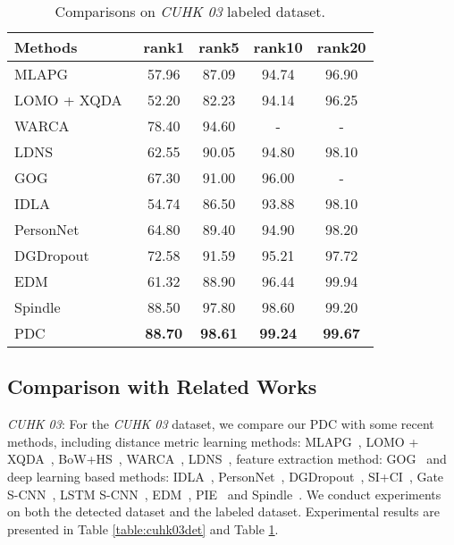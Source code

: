 \documentclass[10pt,twocolumn,letterpaper]{article}
\begin{document}
\begin{table}
\caption{Comparisons on \emph{CUHK 03} labeled dataset.}
\label{table:cuhk03lab}
\footnotesize
\begin{center}
\begin{tabular}{|l|cccc|}
\hline
 Methods            &rank1    &rank5    &rank10   &rank20 \\
\hline
MLAPG~\cite{liao2015efficient} &57.96    &87.09    &94.74    &96.90\\
LOMO + XQDA~\cite{liao2015person} &52.20    &82.23    &94.14    &96.25\\
WARCA~\cite{jose2016scalable}    &78.40    &94.60    &-    &-\\
LDNS~\cite{zhang2016learning}     &62.55    &90.05    &94.80    &98.10\\
GOG~\cite{matsukawa2016hierarchical} &67.30 &91.00 &96.00 &- \\
\hline
IDLA~\cite{ahmed5improved}  &54.74   &86.50    &93.88    &98.10\\
PersonNet~\cite{wu2016personnet}  &64.80   &89.40    &94.90   &98.20\\
DGDropout~\cite{xiao2016learning}               &72.58    &91.59    &95.21    &97.72\\
EDM~\cite{shi2016embedding}                &61.32    &88.90    &96.44    &99.94\\
\hline
Spindle~\cite{zhao2017spindle}   &88.50  &97.80   &98.60 &99.20\\
\hline
PDC      &{\bf88.70}&{\bf98.61}&{\bf99.24}&{\bf99.67}\\
\hline
\end{tabular}
\end{center}
\vspace{-7mm}
\end{table}

\subsection{Comparison with Related Works}

{ \emph{CUHK 03}:} For the \emph{CUHK 03} dataset, we compare our PDC with some recent methods, including distance metric learning methods: MLAPG~\cite{liao2015efficient}, LOMO + XQDA~\cite{liao2015person}, BoW+HS~\cite{zheng2015scalable}, WARCA~\cite{jose2016scalable}, LDNS~\cite{zhang2016learning}, feature extraction method: GOG~\cite{matsukawa2016hierarchical} and deep learning based methods: IDLA~\cite{ahmed5improved}, PersonNet~\cite{wu2016personnet}, DGDropout~\cite{xiao2016learning}, SI+CI~\cite{wangjoint}, Gate S-CNN~\cite{varior2016gated}, LSTM S-CNN~\cite{varior2016siamese}, EDM~\cite{shi2016embedding},
PIE~\cite{zheng2017pose} and Spindle~\cite{zhao2017spindle}. We conduct experiments on both the detected dataset and the labeled dataset. Experimental results are presented in Table \ref{table:cuhk03det} and Table \ref{table:cuhk03lab}.
\end{document}
